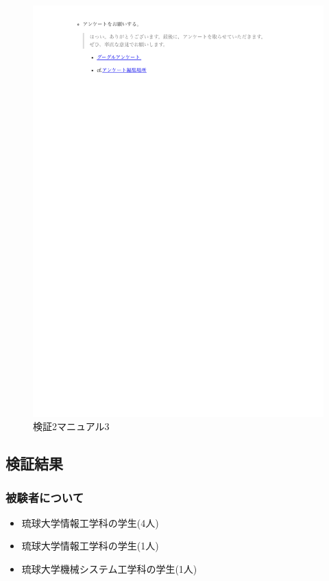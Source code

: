     \vspace{4cm}%
    \begin{figure}[H]
        \includegraphics[width=15cm]{./fig/chapter4/inspect_2/manual/manual_3.pdf}
        \caption{検証2マニュアル3}
        \label{検証２マニュアル３}
    \end{figure}



\subsection{検証結果}
    \subsubsection{被験者について}
    \begin{itemize}
        \item 琉球大学情報工学科の学生(4人)
        \item 琉球大学情報工学科の学生(1人)
        \item 琉球大学機械システム工学科の学生(1人)
    \end{itemize}


